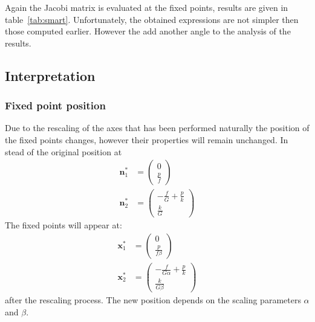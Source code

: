 Again the Jacobi matrix is evaluated at the fixed points, results are given in table~\ref{tab:smart}. Unfortunately, the obtained expressions are not simpler then those computed earlier. However the add another angle to the analysis of the results. 


\subsection{Interpretation}
\subsubsection{Fixed point position}
Due to the rescaling of the axes that has been performed naturally the position of the fixed points changes, however their properties will remain unchanged.
In stead of the original position at
\begin{align}
\mathbf{n}_1^* &= \begin{pmatrix}
0 \\ \frac{p}{f} 
\end{pmatrix} \\
\mathbf{n}_2^* &= \begin{pmatrix}
-\frac{f}{G} + \frac{p}{k} \\
\frac{k}{G}
\end{pmatrix}
\end{align}
The fixed points will appear at:
\begin{align}
\mathbf{x}_1^* &= \begin{pmatrix}
0 \\ \frac{p}{f\beta} 
\end{pmatrix} \\
\mathbf{x}_2^* &= \begin{pmatrix}
-\frac{f}{G\alpha} + \frac{p}{k} \\
\frac{k}{G\beta}
\end{pmatrix}
\end{align}
after the rescaling process. The new position depends on the scaling parameters $\alpha$ and $\beta$.


